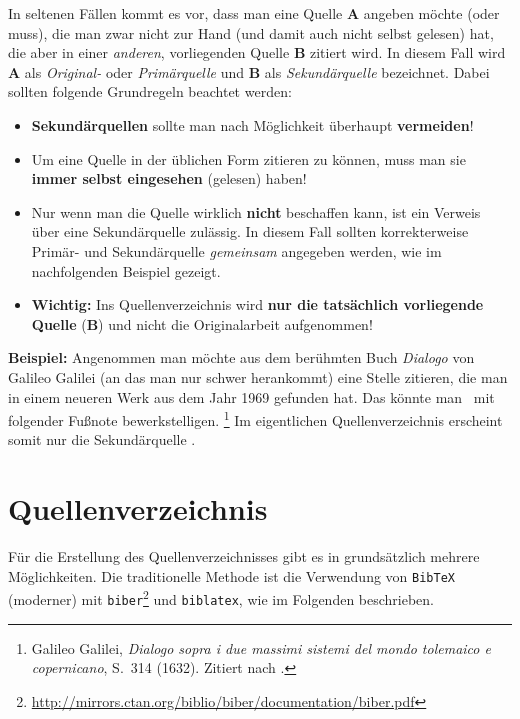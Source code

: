 In seltenen Fällen kommt es vor, dass man eine Quelle \textbf{A} angeben möchte (oder muss), die man zwar nicht zur
Hand (und damit auch nicht selbst gelesen) hat, die aber in einer \emph{anderen}, vorliegenden Quelle \textbf{B}
zitiert wird. In diesem Fall wird \textbf{A} als \emph{Original-} oder \emph{Primärquelle} und \textbf{B} als
\emph{Sekundärquelle} bezeichnet. Dabei sollten folgende Grundregeln beachtet werden:
%
\begin{itemize}
\item
\textbf{Sekundärquellen} sollte man nach Möglichkeit überhaupt \textbf{vermeiden}!
\item
Um eine Quelle in der üblichen Form zitieren zu können, muss man sie \textbf{immer selbst
eingesehen} (gelesen) haben!
\item
Nur wenn man die Quelle wirklich \textbf{nicht} beschaffen kann, ist ein Verweis über eine Sekundärquelle zulässig.
In diesem Fall sollten korrekterweise Pri\-mär- und Sekundärquelle \emph{gemeinsam} angegeben werden, wie im
nachfolgenden Beispiel gezeigt.
\item
\textbf{Wichtig:} Ins Quellenverzeichnis wird \textbf{nur die tatsächlich vorliegende Quelle} 
(\textbf{B}) und nicht die Originalarbeit aufgenommen!
\end{itemize}
%
\textbf{Beispiel:} Angenommen man möchte aus dem berühmten Buch \emph{Dialogo} von Galileo Galilei (an das man nur
schwer herankommt) eine Stelle zitieren, die man in einem neueren Werk aus dem Jahr 1969 gefunden hat. Das könnte man
\zB\ mit folgender Fußnote bewerkstelligen.%
\footnote{Galileo Galilei, \emph{Dialogo sopra i due massimi sistemi del mondo tolemaico e copernicano}, 
S.~314 (1632). Zitiert nach \cite[S.~59]{Hemleben1969}.} %
Im eigentlichen Quellenverzeichnis erscheint somit nur die Sekundärquelle \cite{Hemleben1969}.



\section{Quellenverzeichnis}


Für die Erstellung des Quellenverzeichnisses gibt es in \latex grundsätzlich mehrere Möglichkeiten. Die traditionelle
Methode ist die Verwendung von \texttt{BibTeX} \cite{Patashnik1988} \bzw (moderner) mit
\texttt{biber}\footnote{\url{http://mirrors.ctan.org/biblio/biber/documentation/biber.pdf}} und \texttt{biblatex},
wie im Folgenden beschrieben.


